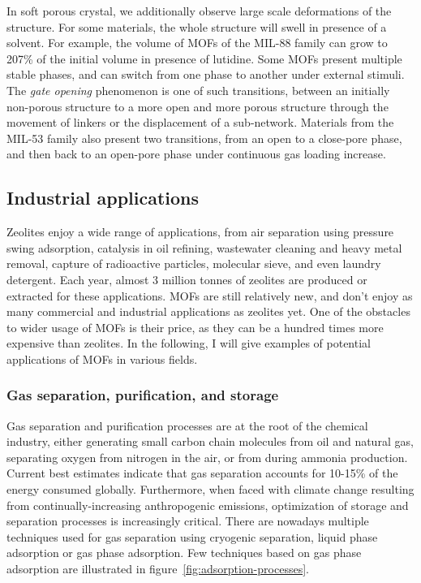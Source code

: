 \documentclass[thesis]{subfiles}
\begin{document}
In soft porous crystal, we additionally observe large scale deformations of the
structure. For some materials, the whole structure will swell in presence of a
solvent. For example, the volume of MOFs of the MIL-88 family can grow to 207\%
of the initial volume in presence of lutidine\cite{Serre2007}. Some MOFs present
multiple stable phases, and can switch from one phase to another under external
stimuli. The \emph{gate opening} phenomenon is one of such transitions, between
an initially non-porous structure to a more open and more porous structure
through the movement of linkers or the displacement of a sub-network. Materials
from the MIL-53 family also present two transitions, from an open to a
close-pore phase, and then back to an open-pore phase\cite{Serre2002} under
continuous gas loading increase.

\subsection{Industrial applications}

Zeolites enjoy a wide range of applications, from air separation using pressure
swing adsorption\cite{Rege1997}, catalysis in oil refining\cite{Primo2014},
wastewater cleaning and heavy metal removal\cite{Curkovi1997}, capture of
radioactive particles\cite{Borai2009}, molecular sieve\cite{Flanigen1978}, and
even laundry detergent\cite{Karge1989}. Each year, almost 3 million tonnes of
zeolites are produced or extracted for these applications. MOFs are still
relatively new, and don't enjoy as many commercial and industrial applications
as zeolites yet. One of the obstacles to wider usage of MOFs is their price,
as they can be a hundred times more expensive than zeolites. In the following, I
will give examples of potential applications of MOFs in various fields.

\subsubsection{Gas separation, purification, and storage}

Gas separation and purification processes are at the root of the chemical
industry, either generating small carbon chain molecules from oil and natural
gas, separating oxygen from nitrogen in the air, or  from  during
ammonia production. Current best estimates indicate that gas separation accounts
for 10-15\% of the energy consumed globally\cite{Sholl2016}. Furthermore, when
faced with climate change resulting from continually-increasing anthropogenic
 emissions, optimization of storage and separation processes is
increasingly critical. There are nowadays multiple techniques used for gas
separation using cryogenic separation, liquid phase adsorption or gas phase
adsorption. Few techniques based on gas phase adsorption are illustrated in
figure~\ref{fig:adsorption-processes}.
\end{document}
